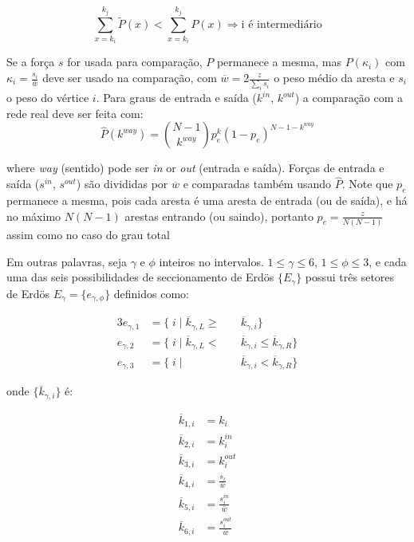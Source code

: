 \documentclass[a4paper,openright,12pt]{report} %
\begin{document}
\begin{equation}\label{criterio2}
	\sum_{x=k_i}^{k_j} \widetilde{P}(x) < \sum_{x=k_i}^{k_j} P(x) \Rightarrow \text{i é intermediário}
\end{equation}

Se a força $s$ for usada para comparação, $P$ permanece a mesma, mas
$P(\kappa_i)$ com $\kappa_i=\frac{s_i}{\overline{w}}$
deve ser usado na comparação, com
$\overline{w}=2\frac{z}{\sum_is_i}$
o peso médio da aresta e $s_i$ o peso do vértice $i$.
Para graus de entrada e saída
($k^{in}$, $k^{out}$)
a comparação com a rede real deve ser feita com:
\begin{equation}
	\hat{P}(k^{way})=\binom{N-1}{k^{way}}p_e^k(1-p_e)^{N-1-k^{way}}
\end{equation}

\noindent where \emph{way} (sentido) pode ser \emph{in} or \emph{out} (entrada e saída).
Forças de entrada e saída ($s^{in}$, $s^{out}$)
são divididas por
$\overline{w}$
e comparadas também usando $\hat{P}$. Note que $p_e$ permanece a mesma,
pois cada aresta é uma aresta de entrada (ou de saída), e há no máximo $N(N-1)$
arestas entrando (ou saindo), portanto
$p_e=\frac{z}{N(N-1)}$
assim como no caso do grau total

Em outras palavras, seja $\gamma$ e $\phi$ inteiros no intervalos.
$1 \leq \gamma \leq 6$, $1 \leq \phi \leq 3$,
e cada uma das seis possibilidades de seccionamento de Erdös 
$\{E_{\gamma}\}$
possui três setores de Erdös
$E_{\gamma}= \{e_{\gamma, \phi} \}$
definidos como:

\begin{alignat}{3}\label{eq:part}
	e_{\gamma,1}&=\{\;i\;|\;\overline{k}_{\gamma,L}\geq&&\overline{k}_{\gamma,i}\} \nonumber \\
	e_{\gamma,2}&=\{\;i\;|\;\overline{k}_{\gamma,L}<\;&&\overline{k}_{\gamma,i}\leq\overline{k}_{\gamma,R}\} \\ 
	e_{\gamma,3}&=\{\;i\;|\;&&\overline{k}_{\gamma,i}<\overline{k}_{\gamma,R}\} \nonumber
\end{alignat}

\noindent onde $\{\overline{k}_{\gamma,i}\}$ é:

\begin{equation}
	\begin{split}
		\overline{k}_{1,i}&=k_i \\
		\overline{k}_{2,i}&=k_i^{in} \\
		\overline{k}_{3,i}&=k_i^{out} \\
		\overline{k}_{4,i}&=\frac{s_i}{\overline{w}} \\
		\overline{k}_{5,i}&=\frac{s_i^{in}}{\overline{w}} \\
		\overline{k}_{6,i}&=\frac{s_i^{out}}{\overline{w}} \\
	\end{split}
\end{equation}
\end{document}
